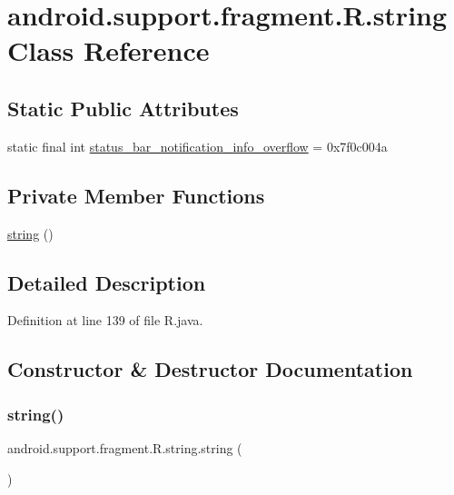 \hypertarget{classandroid_1_1support_1_1fragment_1_1_r_1_1string}{}\section{android.\+support.\+fragment.\+R.\+string Class Reference}
\label{classandroid_1_1support_1_1fragment_1_1_r_1_1string}
\subsection*{Static Public Attributes}
\begin{DoxyCompactItemize}
\item 
static final int \mbox{\hyperlink{classandroid_1_1support_1_1fragment_1_1_r_1_1string_afe54f0256b7cd91c2b0175f6dd55f9cc}{status\+\_\+bar\+\_\+notification\+\_\+info\+\_\+overflow}} = 0x7f0c004a
\end{DoxyCompactItemize}
\subsection*{Private Member Functions}
\begin{DoxyCompactItemize}
\item 
\mbox{\hyperlink{classandroid_1_1support_1_1fragment_1_1_r_1_1string_a755e96c4ca3e1d47b45d1ada149a3285}{string}} ()
\end{DoxyCompactItemize}


\subsection{Detailed Description}


Definition at line 139 of file R.\+java.



\subsection{Constructor \& Destructor Documentation}
\mbox{\label{classandroid_1_1support_1_1fragment_1_1_r_1_1string_a755e96c4ca3e1d47b45d1ada149a3285}} 
\subsubsection{\texorpdfstring{string()}{string()}}
{\footnotesize\ttfamily android.\+support.\+fragment.\+R.\+string.\+string (\begin{DoxyParamCaption}{ }\end{DoxyParamCaption})\hspace{0.3cm}{\ttfamily [private]}}



